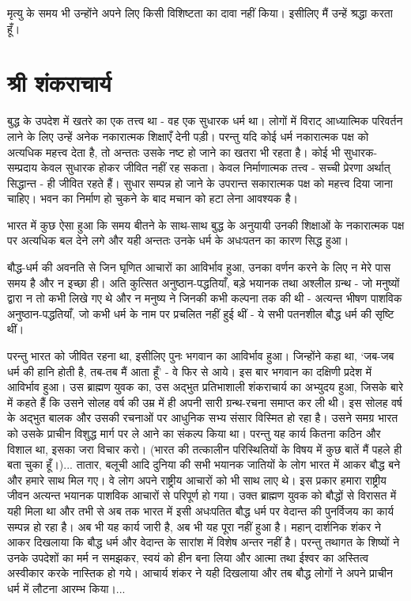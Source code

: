 मृत्यु के समय भी उन्होंने अपने लिए किसी विशिष्टता का दावा नहीं किया। इसीलिए मैं उन्हें श्रद्धा करता हूँ।


\section*{श्री शंकराचार्य}


बुद्ध के उपदेश में खतरे का एक तत्त्व था - वह एक सुधारक धर्म था। लोगों में विराट् आध्यात्मिक परिवर्तन लाने के लिए उन्हें अनेक नकारात्मक शिक्षाएँ देनी पड़ी। परन्तु यदि कोई धर्म नकारात्मक पक्ष को अत्यधिक महत्त्व देता है, तो अन्ततः उसके नष्ट हो जाने का खतरा भी रहता है। कोई भी सुधारक-सम्प्रदाय केवल सुधारक होकर जीवित नहीं रह सकता। केवल निर्माणात्मक तत्त्व - सच्ची प्रेरणा अर्थात् सिद्धान्त - ही जीवित रहते हैं। सुधार सम्पन्न हो जाने के उपरान्त सकारात्मक पक्ष को महत्त्व दिया जाना चाहिए। भवन का निर्माण हो चुकने के बाद मचान को हटा लेना आवश्यक है। 

भारत में कुछ ऐसा हुआ कि समय बीतने के साथ-साथ बुद्ध के अनुयायी उनकी शिक्षाओं के नकारात्मक पक्ष पर अत्यधिक बल देने लगे और यही अन्ततः उनके धर्म के अधःपतन का कारण सिद्ध हुआ। 

बौद्ध-धर्म की अवनति से जिन घृणित आचारों का आविर्भाव हुआ, उनका वर्णन करने के लिए न मेरे पास समय है और न इच्छा ही। अति कुत्सित अनुष्ठान-पद्धतियाँ, बड़े भयानक तथा अश्लील ग्रन्थ - जो मनुष्यों द्वारा न तो कभी लिखे गए थे और न मनुष्य ने जिनकी कभी कल्पना तक की थी - अत्यन्त भीषण पाशविक अनुष्ठान-पद्धतियाँ, जो कभी धर्म के नाम पर प्रचलित नहीं हुई थीं - ये सभी पतनशील बौद्ध धर्म की सृष्टि थीं। 

परन्तु भारत को जीवित रहना था, इसीलिए पुनः भगवान का आविर्भाव हुआ। जिन्होंने कहा था, ‘जब-जब धर्म की हानि होती है, तब-तब मैं आता हूँ’ - वे फिर से आये। इस बार भगवान का दक्षिणी प्रदेश में आविर्भाव हुआ। उस ब्राह्मण युवक का, उस अद्भुत प्रतिभाशाली शंकराचार्य का अभ्युदय हुआ, जिसके बारे में कहते हैं कि उसने सोलह वर्ष की उम्र में ही अपनी सारी ग्रन्थ-रचना समाप्त कर ली थी। इस सोलह वर्ष के अद्भुत बालक और उसकी रचनाओं पर आधुनिक सभ्य संसार विस्मित हो रहा है। उसने समग्र भारत को उसके प्राचीन विशुद्ध मार्ग पर ले आने का संकल्प किया था। परन्तु यह कार्य कितना कठिन और विशाल था, इसका जरा विचार करो। (भारत की तत्कालीन परिस्थितियों के विषय में कुछ बातें मैं पहले ही बता चुका हूँ।)... तातार, बलूची आदि दुनिया की सभी भयानक जातियों के लोग भारत में आकर बौद्ध बने और हमारे साथ मिल गए। वे लोग अपने राष्ट्रीय आचारों को भी साथ लाए थे। इस प्रकार हमारा राष्ट्रीय जीवन अत्यन्त भयानक पाशविक आचारों से परिपूर्ण हो गया। उक्त ब्राह्मण युवक को बौद्धों से विरासत में यही मिला था और तभी से अब तक भारत में इसी अधःपतित बौद्ध धर्म पर वेदान्त की पुनर्विजय का कार्य सम्पन्न हो रहा है। अब भी यह कार्य जारी है, अब भी यह पूरा नहीं हुआ है। महान् दार्शनिक शंकर ने आकर दिखलाया कि बौद्ध धर्म और वेदान्त के सारांश में विशेष अन्तर नहीं है। परन्तु तथागत के शिष्यों ने उनके उपदेशों का मर्म न समझकर, स्वयं को हीन बना लिया और आत्मा तथा ईश्वर का अस्तित्व अस्वीकार करके नास्तिक हो गये। आचार्य शंकर ने यही दिखलाया और तब बौद्ध लोगों ने अपने प्राचीन धर्म में लौटना आरम्भ किया।... 

